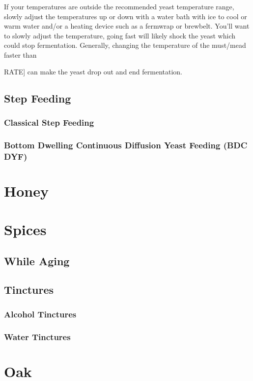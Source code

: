 \documentclass{article}
\begin{document}
   If your temperatures are outside the recommended yeast temperature range, slowly adjust the temperatures up or 
   down with a water bath with ice to cool or 
   warm water and/or a heating device such as a fermwrap or brewbelt. You'll want to slowly adjust the temperature, 
   going fast will likely shock the yeast which
   could stop fermentation. Generally, changing the temperature of the must/mead faster than {RATE] can make the 
   yeast drop out and end fermentation.

 \subsection{Step Feeding}
  \subsubsection{Classical Step Feeding}
  \subsubsection{Bottom Dwelling Continuous Diffusion Yeast Feeding (BDC DYF)}

\section{Honey}

\section{Spices}
 \subsection{While Aging}
 \subsection{Tinctures}
  \subsubsection{Alcohol Tinctures}
  \subsubsection{Water Tinctures}

\section{Oak}
}
\end{document}
